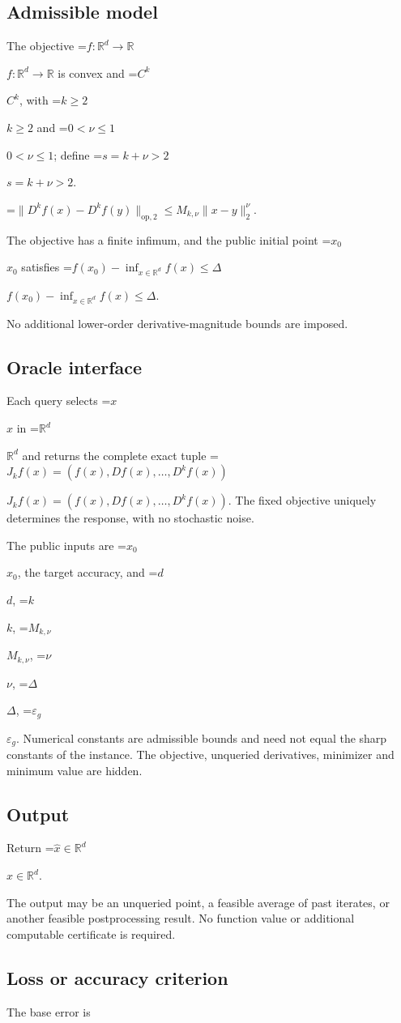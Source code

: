 \documentclass[10pt,a4paper]{article}
\newcommand{\AtlasMath}[1]{\par\begingroup\centering\setbox0=\hbox{$\displaystyle #1$}\ifdim\wd0>1.4\linewidth\typeout{ATLAS WIDE FORMULA: \the\wd0}\fi\ifdim\wd0>\linewidth\resizebox{\linewidth}{!}{\box0}\else\box0\fi\par\endgroup}
\newcommand{\AtlasInlineMath}[1]{\begingroup\setbox0=\hbox{$#1$}\ifdim\wd0>.4\linewidth\endgroup\AtlasMath{#1}\else\endgroup$#1$\fi}
\begin{document}
\subsection{Admissible model}
The objective \AtlasInlineMath{f:\mathbb{R}^d\to\mathbb{R}} is convex and \AtlasInlineMath{C^k}, with \AtlasInlineMath{k\ge2} and \AtlasInlineMath{0<\nu\le1}; define \AtlasInlineMath{s=k+\nu>2}.


\AtlasMath{\|D^{k}f(x)-D^{k}f(y)\|_{\mathrm{op},2}\le M_{k,\nu}\|x-y\|_{2}^{\nu}.}


The objective has a finite infimum, and the public initial point \AtlasInlineMath{x_0} satisfies \AtlasInlineMath{f(x_0)-\inf_{x\in \mathbb{R}^d}f(x)\le\Delta}.

No additional lower-order derivative-magnitude bounds are imposed.

\subsection{Oracle interface}
Each query selects \AtlasInlineMath{x} in \AtlasInlineMath{\mathbb{R}^d} and returns the complete exact tuple \AtlasInlineMath{J_{k}f(x)=(f(x),Df(x),\ldots,D^{k}f(x))}. The fixed objective uniquely determines the response, with no stochastic noise.

The public inputs are \AtlasInlineMath{x_0}, the target accuracy, and \AtlasInlineMath{d}, \AtlasInlineMath{k}, \AtlasInlineMath{M_{k,\nu}}, \AtlasInlineMath{\nu}, \AtlasInlineMath{\Delta}, \AtlasInlineMath{\varepsilon_g}. Numerical constants are admissible bounds and need not equal the sharp constants of the instance. The objective, unqueried derivatives, minimizer and minimum value are hidden.

\subsection{Output}
Return \AtlasInlineMath{\widehat{x}\in \mathbb{R}^d}.

The output may be an unqueried point, a feasible average of past iterates, or another feasible postprocessing result. No function value or additional computable certificate is required.

\subsection{Loss or accuracy criterion}
The base error is
\end{document}
